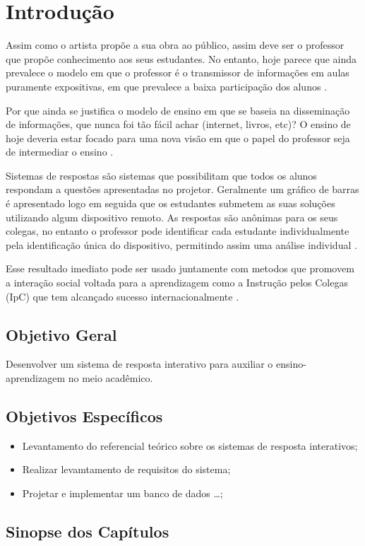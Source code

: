 \chapter{Introdução}

Assim como o artista propõe a sua obra ao público, assim deve ser o professor que
propõe conhecimento aos seus estudantes. No entanto, hoje parece que ainda prevalece
o modelo em que o professor é o transmissor de informações em aulas puramente expositivas,
em que prevalece a baixa participação dos alunos \cite[p. 8]{Silva2001}.

Por que ainda se justifica o modelo de ensino em que se baseia
na disseminação de informações, que nunca foi tão fácil achar (internet,
livros, etc)? O ensino de hoje deveria estar focado para uma nova
visão em que o papel do professor seja de intermediar o ensino \cite[p. 19]{Araujo2013}.

Sistemas de respostas são sistemas que possibilitam que todos os alunos
respondam a questões apresentadas no projetor. Geralmente um gráfico de barras
é apresentado logo em seguida que os estudantes submetem as suas soluções
utilizando algum dispositivo remoto. As respostas são anônimas para os seus colegas,
no entanto o professor pode identificar cada estudante individualmente pela
identificação única do dispositivo, permitindo assim uma análise individual \cite[p. 1]{Kay2009}.


Esse resultado imediato pode ser usado juntamente
com metodos que promovem a interação social voltada para a aprendizagem como a
Instrução pelos Colegas (IpC) que tem alcançado sucesso internacionalmente \cite[p. 3]{Araujo2013}.

\section{Objetivo Geral}
Desenvolver um sistema de resposta interativo
para auxiliar o ensino-aprendizagem no meio acadêmico.

\section{Objetivos Específicos}

\begin{itemize}
    \item Levantamento do referencial te\'orico sobre os sistemas de resposta
    interativos;
    \item Realizar levamtamento de requisitos do sistema;
    \item Projetar e implementar um banco de dados \ldots;
\end{itemize}

\section{Sinopse dos Capítulos}
